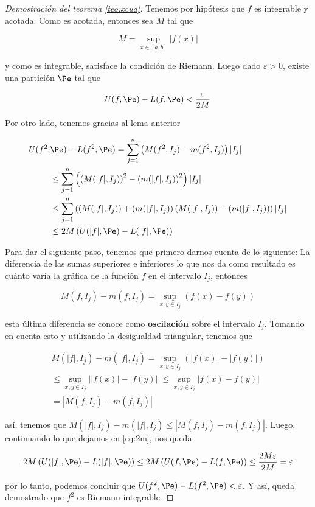 \begin{proof}[Demostración del teorema \ref{teo:xcua}]
    Tenemos por hipótesis que $f$ es integrable y acotada. Como es acotada, entonces sea $M$ tal que
    
    \[
    M = \sup_{x \in [a,b]} |f(x)|
    \]
    
    \noindent y como es integrable, satisface la condición de Riemann. Luego dado $\varepsilon > 0$, existe una partición $\Pe$ tal que
    
    \[
    U(f, \Pe) - L(f, \Pe) < \frac{\varepsilon}{2M}
    \]
    
    Por otro lado, tenemos gracias al lema anterior
    
    \begin{align}\label{eq:2m}
        \begin{split}
            U(f^2, &\Pe) - L(f^2, \Pe) = \sum_{j=1}^n \left(M(f^2, I_j) - m(f^2, I_j)\right)|I_j| \\
            &\leq \sum_{j=1}^n \left( \left(M(|f|, I_j)\right)^2 - \left(m(|f|, I_j)\right)^2 \right)|I_j| \\
            &\leq \sum_{j=1}^n \left( \left(M(|f|, I_j)\right) + \left(m(|f|, I_j)\right)\left(M(|f|, I_j)\right) - \left(m(|f|, I_j)\right) \right)|I_j| \\
            &\leq 2M\left(U(|f|,\Pe) - L(|f|, \Pe)\right)
        \end{split}
    \end{align}
    
    Para dar el siguiente paso, tenemos que primero darnos cuenta de lo siguiente: La diferencia de las sumas superiores e inferiores lo que nos da como resultado es cuánto varía la gráfica de la función $f$ en el intervalo $I_j$, entonces
    
    \[
    M(f, I_j) - m(f, I_j) = \sup_{x, y \in I_j} (f(x) - f(y))
    \]
    
    esta última diferencia se conoce como \textbf{oscilación} sobre el intervalo $I_j$. Tomando en cuenta esto y utilizando la desigualdad triangular, tenemos que
    
    \begin{gather*}
    M(|f|, I_j) - m(|f|, I_j) = \sup_{x, y \in I_j} (|f(x)| - |f(y)|) \\
    \leq \sup_{x, y \in I_j} \left| |f(x)| - |f(y)| \right| \leq \sup_{x, y \in I_j} \left| f(x) - f(y) \right| \\
    = |M(f, I_j) - m(f, I_j)|
    \end{gather*}
    
    \noindent así, tenemos que $M(|f|, I_j) - m(|f|, I_j) \leq |M(f, I_j) - m(f, I_j)|$. Luego, continuando lo que dejamos en \ref{eq:2m}, nos queda
    
    \[
    2M\left(U(|f|,\Pe) - L(|f|, \Pe)\right) \leq 2M\left(U(f,\Pe) - L(f, \Pe)\right) \leq \frac{2M\varepsilon}{2M} = \varepsilon
    \]
    
    \noindent por lo tanto, podemos concluir que $U(f^2, \Pe) - L(f^2, \Pe) < \varepsilon$. Y así, queda demostrado que $f^2$ es Riemann-integrable.
\end{proof}